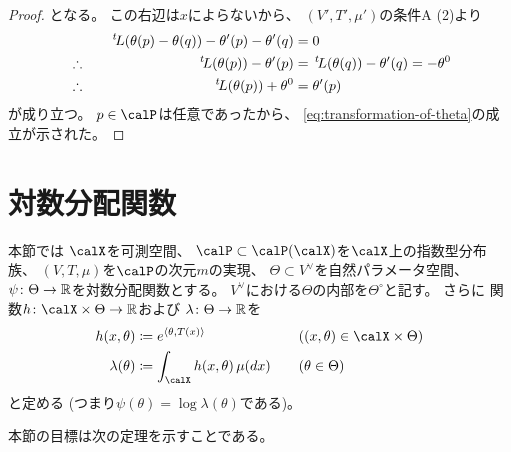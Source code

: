 \documentclass[report]{jlreq}
\begin{document}
\begin{proof}
    となる。
    この右辺は$x$によらないから、
    $(V', T', \mu')$の条件A (2)より
    \begin{alignat}{2}
        &\phantom{\therefore} \quad&
            \,{}^{t}\!L(\theta(p) - \theta(q))
                - \theta'(p) - \theta'(q)
                &= 0
            \\
        &\therefore \quad&
            \,{}^{t}\!L(\theta(p)) - \theta'(p)
                &=
                    \,{}^{t}\!L(\theta(q)) - \theta'(q)
                =
                    - \theta^0
            \\
        &\therefore \quad&
            \,{}^{t}\!L(\theta(p)) + \theta^0
                &=
                    \theta'(p)
    \end{alignat}
    が成り立つ。
    $p \in \calP$は任意であったから、
    \cref{eq:transformation-of-theta}の成立が示された。
\end{proof}

%
\section{対数分配関数}


本節では
$\calX$を可測空間、
$\calP \subset \calP(\calX)$を$\calX$上の指数型分布族、
$(V, T, \mu)$を$\calP$の次元$m$の実現、
$\Theta \subset V^\vee$を自然パラメータ空間、
$\psi \colon \Theta \to \mathbb{R}$を対数分配関数とする。
$V^\vee$における$\Theta$の内部を$\Theta^\circ$と記す。
さらに
関数$h \colon \calX \times \Theta \to \R$および
$\lambda \colon \Theta \to \mathbb{R}$を
\begin{alignat}{2}
    h(x, \theta)
        &\coloneqq e^{\langle \theta, T(x) \rangle}
        &&\quad ((x, \theta) \in \calX \times \Theta) \\
    \lambda(\theta)
        &\coloneqq \int_\calX h(x, \theta) \, \mu(dx)
        &&\quad (\theta \in \Theta)
\end{alignat}
と定める (つまり$\psi(\theta) = \log \lambda(\theta)$である)。

本節の目標は次の定理を示すことである。
\end{document}
